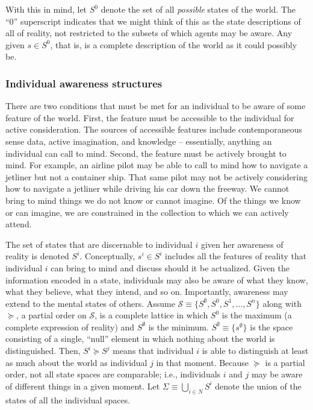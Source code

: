 \documentclass[
11pt,
titlepage,
reqno,
]{article}%
\theoremstyle{definition}
\begin{document}
With this in mind, let $S^0$ denote the set of all \textit{possible} states of the world.
The  ``0'' superscript indicates that we might think of this as the state descriptions of all of reality, not restricted to the subsets of which agents may be aware. Any given $s\in S^0$, that is, is a complete description of the world as it could possibly be. 



\subsubsection{Individual awareness structures}
There are two conditions that must be met for an individual to be aware of some feature of the world. 
First, the feature must be accessible to the individual for active consideration. 
The sources of accessible features include contemporaneous sense data, active imagination, and knowledge -- essentially, anything an individual can call to mind. 
Second, the feature must be actively brought to mind. 
For example, an airline pilot may be able to call to mind how to navigate a jetliner but not a container ship. 
That same pilot may not be actively considering how to navigate a jetliner while driving his car down the freeway. 
We cannot bring to mind things we do not know or cannot imagine.
Of the things we know or can imagine, we are constrained in the collection to which we can actively attend. 


The set of states that are discernable to individual $i$ given her awareness of reality is denoted $S^i$.
Conceptually, $s^i\in S^i$ includes all the features of reality that individual $i$ can bring to mind and discuss should it be actualized.
Given the information encoded in a state, individuals may also be aware of what they know, what they believe, what they intend, and so on. 
Importantly, awareness may extend to the mental states of others. 
Assume $\mathcal{S}\equiv \{S^\emptyset,S^0,S^1,\ldots,S^n\}$ along with $\succeq$, a partial order on $\mathcal{S}$, is a complete lattice in which $S^0$ is the maximum (a complete expression of reality) and $S^\emptyset$ is the minimum. 
$S^\emptyset\equiv\{s^\emptyset\}$ is the space consisting of a single, ``null'' element in which nothing about the world is distinguished.
Then, $S^i\succeq S^j$ means that individual $i$ is able to distinguish at least as much about the world as individual $j$ in that moment.
Because $\succeq$ is a partial order, not all state spaces are comparable; i.e., individuals $i$ and $j$ may be aware of different things in a given moment.
Let $\Sigma\equiv\bigcup_{i\in N}S^i$ denote the union of the states of all the individual spaces.
\end{document}
